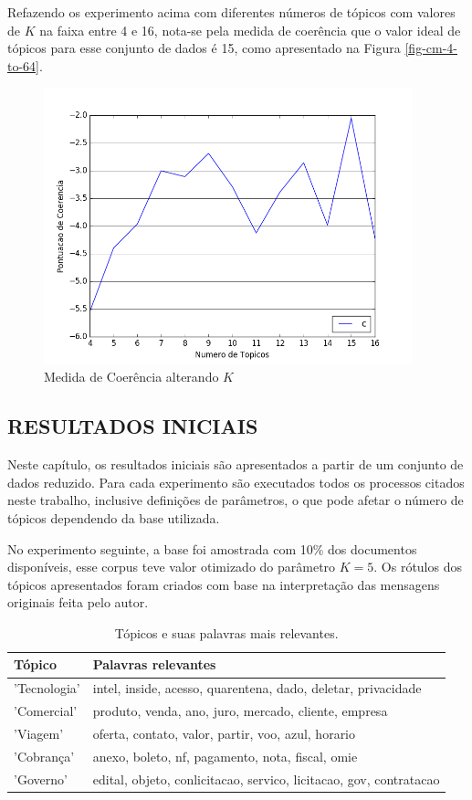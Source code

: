 \documentclass[12pt,a4paper]{article}
\begin{document}
Refazendo os experimento acima com diferentes números de tópicos com valores de $K$ na faixa entre 4 e 16, nota-se pela medida de coerência que o valor ideal de tópicos para esse 
 conjunto de dados é 15, como apresentado na Figura \ref{fig-cm-4-to-64}.

\begin{figure}[H]
	\centering
    \includegraphics[height=8cm]{images/figure_6.png}
    \caption{Medida de Coerência alterando $K$}
    \label{fig-cm-4-to-16}
\end{figure}



\subsection{RESULTADOS INICIAIS}

Neste capítulo,  os resultados iniciais são apresentados a partir de um conjunto de dados reduzido. Para cada experimento são executados todos os processos citados
 neste trabalho, inclusive definições de parâmetros, o que pode afetar o número de tópicos dependendo da base utilizada.

No experimento seguinte, a base foi amostrada com 10\% dos documentos disponíveis, esse corpus teve valor otimizado do parâmetro $K=5$.
Os rótulos dos tópicos apresentados foram criados com base na interpretação das mensagens originais feita pelo autor.

\begin{table}[h]
  \centering
  \begin{tabular}{ll}
  Tópico                   & Palavras relevantes \\
  \hline
  'Tecnologia'               & intel, inside, acesso, quarentena, dado, deletar, privacidade \\
  'Comercial'                & produto, venda, ano, juro, mercado, cliente, empresa \\
  'Viagem'                   & oferta, contato, valor, partir, voo, azul, horario \\
  'Cobrança'                 & anexo, boleto, nf, pagamento, nota, fiscal, omie \\
  'Governo'                  & edital, objeto, conlicitacao, servico, licitacao, gov, contratacao \\
  \hline
  \end{tabular}
  \caption{Tópicos e suas palavras mais relevantes.}
  \label{tab-global-topics}
\end{table}
\end{document}
